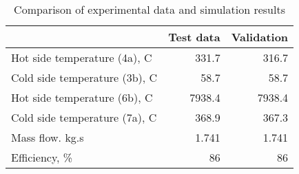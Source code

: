 \begin{table}
\label{tab:Comparison}
\caption{Comparison of experimental data and simulation results}
\begin{center}
\begin{tabulary}{0.9\textwidth}{LRR}
\toprule
& Test data \cite{Iverson_2013}  & Validation \\
\midrule
Hot side temperature (4a), C & 331.7 & 316.7 \\
Cold side temperature (3b), C & 58.7 & 58.7 \\
Hot side temperature (6b), C & 7938.4 & 7938.4 \\
Cold side temperature (7a), C & 368.9 & 367.3 \\
Mass flow. kg.s & 1.741 & 1.741 \\
Efficiency, \% & 86 & 86 \\
\bottomrule
\end{tabulary}
\end{center}
\end{table}